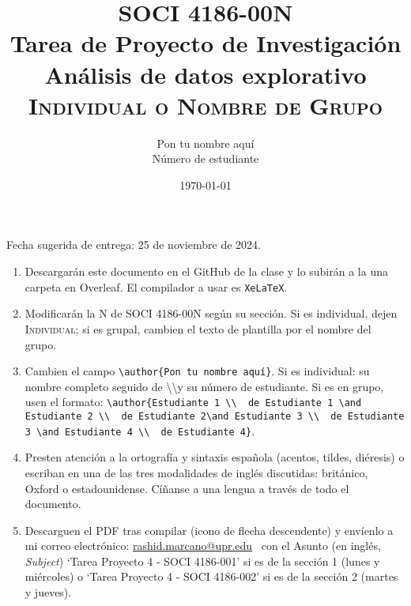 \documentclass[11pt]{article}
\title{SOCI 4186-00N\\ Tarea de Proyecto de Investigación \textnumero 5 \\ Análisis de datos explorativo \\ \textsc{Individual o Nombre de Grupo}}
\author{Pon tu nombre aquí \\ Número de estudiante}
\date{\today} %
\begin{document}
\singlespacing
\maketitle
Fecha sugerida de entrega: 25 de noviembre de 2024.

\begin{enumerate}
    \item Descargarán este documento en el GitHub de la clase y lo subirán a la una carpeta en Overleaf. El compilador a usar es \texttt{XeLaTeX}.
    \item Modificarán la N de SOCI 4186-00N según su sección. Si es individual, dejen \textsc{Individual}; si es grupal, cambien el texto de plantilla por el nombre del grupo.
    \item Cambien el campo \texttt{\textbackslash author\{Pon tu nombre aquí\}}. Si es individual: su nombre completo seguido de \textbackslash\textbackslash y su número de estudiante. Si es en grupo, usen el formato: \texttt{\textbackslash author\{Estudiante 1 \textbackslash\textbackslash \ \textnumero\ de Estudiante 1 \textbackslash and Estudiante 2 \textbackslash\textbackslash \ \textnumero\ de Estudiante 2\textbackslash and Estudiante 3 \textbackslash\textbackslash \ \textnumero\ de Estudiante 3 \textbackslash and Estudiante 4 \textbackslash\textbackslash\ \textnumero\ de Estudiante 4\}}.
    \item Presten atención a la ortografía y sintaxis española (acentos, tildes, diéresis) o escriban en una de las tres modalidades de inglés discutidas: británico, Oxford o estadounidense. Cíñanse a una lengua a través de todo el documento.
    \item Descarguen el PDF tras compilar (icono de flecha descendente) y envíenlo a mi correo electrónico: \href{mailto:rashid.marcano@upr.edu}{rashid.marcano@upr.edu}%
     ~con el Asunto (en inglés, \textit{Subject}) `Tarea Proyecto 4 - SOCI 4186-001' si es de la sección 1 (lunes y miércoles) o `Tarea Proyecto 4 - SOCI 4186-002' si es de la sección 2 (martes y jueves).
\end{enumerate}
\end{document}
